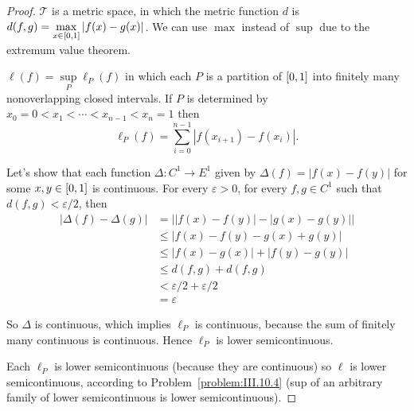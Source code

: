 \begin{proof}
    \( \mathscr{T} \) is a metric space, in which the metric function \( d \) is \( d(f, g) = \max\limits_{x\in\left\lbrack{0,1}\right\rbrack} \left\vert f(x) - g(x) \right\vert \). We can use \( \max \) instead of \( \sup \) due to the extremum value theorem.

    \( \ell(f) = \sup\limits_{P} \ell_{P}(f) \) in which each \( P \) is a partition of \( \left\lbrack{0,1}\right\rbrack \) into finitely many nonoverlapping closed intervals. If \( P \) is determined by \( x_{0} = 0 < x_{1} < \cdots < x_{n-1} < x_{n} = 1 \) then
    \[
        \ell_{P}(f) = \sum^{n-1}_{i=0} \left\vert f(x_{i+1}) - f(x_{i}) \right\vert.
    \]

    Let's show that each function \( \Delta: C^{1} \to E^{1} \) given by \( \Delta(f) = \left\vert f(x) - f(y) \right\vert \) for some \( x, y \in \left\lbrack{0,1}\right\rbrack \) is continuous. For every \( \varepsilon > 0 \), for every \( f, g \in C^{1} \) such that \( d(f, g) < \varepsilon/2 \), then
    \begingroup
    \allowdisplaybreaks%
    \begin{align*}
        \left\vert \Delta(f) - \Delta(g) \right\vert & = \left\vert \left\vert f(x) - f(y) \right\vert - \left\vert g(x) - g(y) \right\vert \right\vert \\
                                                     & \le \left\vert f(x) - f(y) - g(x) + g(y) \right\vert                                             \\
                                                     & \le \left\vert f(x) - g(x) \right\vert + \left\vert f(y) - g(y) \right\vert                      \\
                                                     & \le d(f, g) + d(f, g)                                                                            \\
                                                     & < \varepsilon/2 + \varepsilon/2                                                                  \\
                                                     & = \varepsilon
    \end{align*}
    \endgroup

    So \( \Delta \) is continuous, which implies \( \ell_{P} \) is continuous, because the sum of finitely many continuous is continuous. Hence \( \ell_{P} \) is lower semicontinuous.

    Each \( \ell_{P} \) is lower semicontinuous (because they are continuous) so \( \ell \) is lower semicontinuous, according to Problem~\ref{problem:III.10.4} (sup of an arbitrary family of lower semicontinuous is lower semicontinuous).
\end{proof}

